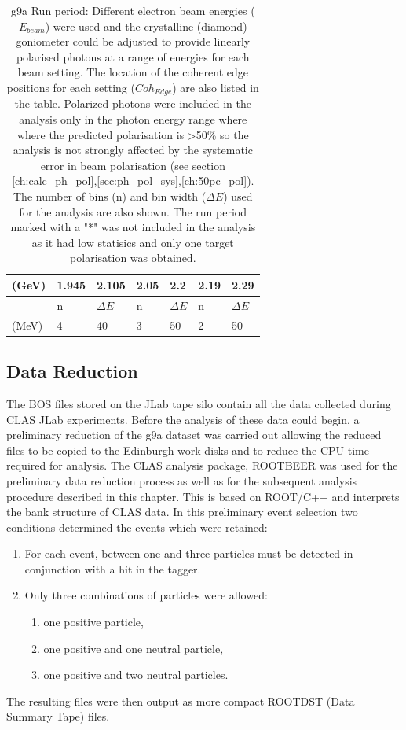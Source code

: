\begin{table}
\begin{center}
\begin{tabular}{ |l||l|l||l|l||l|l||l|l||}
      \multicolumn{3}{|l||}{(GeV)} & 1.945 & 2.105 & 2.05 & 2.2 & 2.19 & 2.29 \\
      \hline
      \multicolumn{3}{|l||}{} & n  &  $\Delta E$ & n  &  $\Delta E$ & n  &  $\Delta E$ \\
      \multicolumn{3}{|l||}{(MeV)} & 4 & 40 & 3 & 50 & 2 & 50  \\
      \hline
    \end{tabular}
  \end{center}
  \caption{g9a Run period: Different electron beam energies ($E_{beam}$) were used and the crystalline (diamond) goniometer could be adjusted to provide linearly polarised photons at a range of energies for each beam setting. The location of the coherent edge positions for each setting ($Coh_{Edge}$) are also listed in the table. Polarized photons were included in the analysis only in the photon energy range where where the predicted polarisation is >50\% so the analysis is not strongly affected by the systematic error in beam polarisation (see section \ref{ch:calc_ph_pol},\ref{sec:ph_pol_sys},\ref{ch:50pc_pol}). The number of bins (n)  and bin width ($\Delta E$) used for the analysis are also shown. 
The run period marked with a "*" was not included in the analysis as it had low statisics and only one target polarisation was obtained.} \label{tab:g9a_configs}
\end{table}

\subsection{Data Reduction}
The BOS files stored on the JLab tape silo contain all the data collected during CLAS JLab experiments. Before the analysis of these data could begin, a preliminary reduction of the g9a dataset was carried out allowing the reduced files to be copied to the Edinburgh work disks and to reduce the CPU time required for analysis. The CLAS analysis package, ROOTBEER \cite{rootbeer} was used for the preliminary data reduction process as well as for the subsequent analysis procedure described in this chapter. This is based on ROOT/C++ and interprets the bank structure of CLAS data. In this preliminary event selection two conditions determined the events which were retained:
\begin{enumerate}
\item  For each event, between one and three particles must be detected in conjunction with a hit in the tagger.
\item  Only three combinations of particles were allowed:
  \begin{enumerate}
  \item one positive particle,
  \item one positive and one neutral particle,
  \item one positive and two neutral particles.
  \end{enumerate}
\end{enumerate}
The resulting files were then output as more compact ROOTDST (Data Summary Tape) files.

